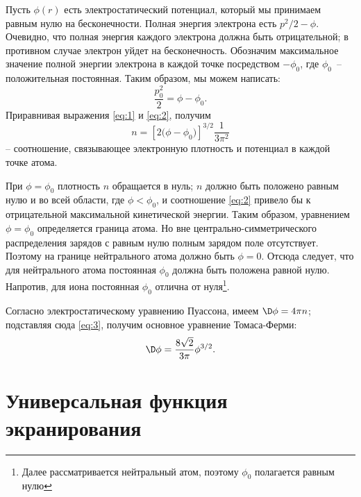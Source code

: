\documentclass[10pt]{hedlab}
\begin{document}
  Пусть \( \phi(r) \) есть электростатический потенциал, который мы принимаем
  равным нулю на бесконечности. Полная энергия электрона есть
  \( p^2 / 2 - \phi \). Очевидно, что полная энергия каждого электрона должна
  быть отрицательной; в противном случае электрон уйдет на бесконечность.
  Обозначим максимальное значение полной энергии электрона в каждой точке
  посредством \( -\phi_0 \), где \( \phi_0 \)~-- положительная постоянная.
  Таким образом, мы можем написать:
  \begin{equation}
    \frac{p_0^2}{2} = \phi - \phi_0.
    \label{eq:2}
  \end{equation}
  Приравнивая выражения \eqref{eq:1} и \eqref{eq:2}, получим
  \begin{equation}
    n = \left[ 2\bigl(\phi - \phi_0\big) \right]^{3 / 2} \frac{1}{3\pi^2}
    \label{eq:3}
  \end{equation}
  -- соотношение, связывающее электронную плотность и потенциал в каждой точке
  атома.

  При \( \phi = \phi_0 \) плотность \( n \) обращается в нуль; \( n \) должно
  быть положено равным нулю и во всей области, где \( \phi < \phi_0 \), и
  соотношение \eqref{eq:2} привело бы к отрицательной максимальной
  кинетической энергии. Таким образом, уравнением \( \phi = \phi_0 \)
  определяется граница атома. Но вне центрально-симметрического распределения
  зарядов с равным нулю полным зарядом поле отсутствует. Поэтому на границе
  нейтрального атома должно быть \( \phi = 0 \). Отсюда следует, что для
  нейтрального атома постоянная \( \phi_0 \) должна быть положена равной нулю.
  Напротив, для иона постоянная \( \phi_0 \) отлична от нуля\footnote{ Далее
  рассматривается нейтральный атом, поэтому \( \phi_0 \) полагается равным
  нулю}.

  Согласно электростатическому уравнению Пуассона, имеем \( \D\phi = 4\pi n \);
  подставляя сюда \eqref{eq:3}, получим основное уравнение Томаса-Ферми:
  \begin{equation}
    \D\phi = \frac{8\sqrt{2}}{3\pi}\phi^{3 / 2}.
    \label{eq:4}
  \end{equation}

  \section{Универсальная функция экранирования}
\end{document}
